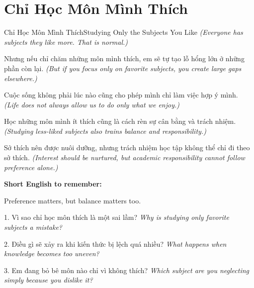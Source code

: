 \section{Chỉ Học Môn Mình Thích}
\begin{truyen}{Chỉ Học Môn Mình Thích}{Studying Only the Subjects You Like}
\textit{(Everyone has subjects they like more. That is normal.)}

Nhưng nếu chỉ chăm những môn mình thích, em sẽ tự tạo lỗ hổng lớn ở những phần còn lại.
\textit{(But if you focus only on favorite subjects, you create large gaps elsewhere.)}

Cuộc sống không phải lúc nào cũng cho phép mình chỉ làm việc hợp ý mình.
\textit{(Life does not always allow us to do only what we enjoy.)}

Học những môn mình ít thích cũng là cách rèn sự cân bằng và trách nhiệm.
\textit{(Studying less-liked subjects also trains balance and responsibility.)}
\end{truyen}

\begin{baihoc}
Sở thích nên được nuôi dưỡng, nhưng trách nhiệm học tập không thể chỉ đi theo sở thích.
\textit{(Interest should be nurtured, but academic responsibility cannot follow preference alone.)}
\end{baihoc}

\begin{ghinhoanh}
\textbf{Short English to remember:}

Preference matters, but balance matters too.

\end{ghinhoanh}

\begin{tuhocnhanh}
1. Vì sao chỉ học môn thích là một sai lầm? \textit{Why is studying only favorite subjects a mistake?}

2. Điều gì sẽ xảy ra khi kiến thức bị lệch quá nhiều? \textit{What happens when knowledge becomes too uneven?}

3. Em đang bỏ bê môn nào chỉ vì không thích? \textit{Which subject are you neglecting simply because you dislike it?}
\end{tuhocnhanh}
\ngancach

